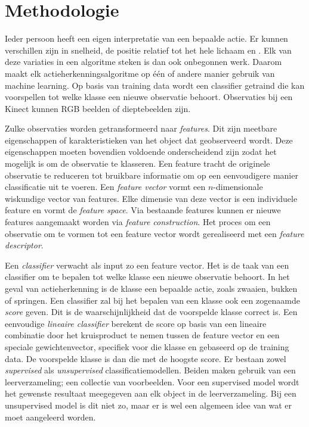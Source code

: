 \chapter{Methodologie}
\label{ch:methodologie}

Ieder persoon heeft een eigen interpretatie van een bepaalde actie. Er kunnen verschillen zijn in snelheid, de positie relatief tot het hele lichaam en . 
Elk van deze variaties in een algoritme steken is dan ook onbegonnen werk. Daarom maakt elk actieherkenningsalgoritme op één of andere manier gebruik van machine learning. Op basis van training data wordt een classifier getraind die kan voorspellen tot welke klasse een nieuwe observatie behoort. Observaties bij een Kinect kunnen RGB beelden of dieptebeelden zijn. 

Zulke observaties worden getransformeerd naar \textit{features}. Dit zijn meetbare eigenschappen of karakteristieken van het object dat geobserveerd wordt. Deze eigenschappen moeten bovendien voldoende onderscheidend zijn zodat het mogelijk is om de observatie te klasseren. Een feature tracht de originele observatie te reduceren tot bruikbare informatie om op een eenvoudigere manier classificatie uit te voeren. Een \textit{feature vector} vormt een $n$-dimensionale wiskundige vector van features. Elke dimensie van deze vector is een individuele feature en vormt de \textit{feature space}. Via bestaande features kunnen er nieuwe features aangemaakt worden via \textit{feature construction}. Het proces om een observatie om te vormen tot een feature vector wordt gerealiseerd met een \textit{feature descriptor}.

Een \textit{classifier} verwacht als input zo een feature vector. Het is de taak van een classifier om te bepalen tot welke klasse een nieuwe observatie behoort. In het geval van actieherkenning is de klasse een bepaalde actie, zoals zwaaien, bukken of springen. Een classifier zal bij het bepalen van een klasse ook een zogenaamde \textit{score} geven. Dit is de waarschijnlijkheid dat de voorspelde klasse correct is. Een eenvoudige \textit{lineaire classifier} berekent de score op basis van een lineaire combinatie door het kruisproduct te nemen tussen de feature vector en een speciale gewichtenvector, specifiek voor die klasse en gebaseerd op de training data. De voorspelde klasse is dan die met de hoogste score. Er bestaan zowel \textit{supervised} als \textit{unsupervised} classificatiemodellen. Beiden maken gebruik van een leerverzameling; een collectie van voorbeelden. Voor een supervised model wordt het gewenste resultaat meegegeven aan elk object in de leerverzameling. Bij een unsupervised model is dit niet zo, maar er is wel een algemeen idee van wat er moet aangeleerd worden.

